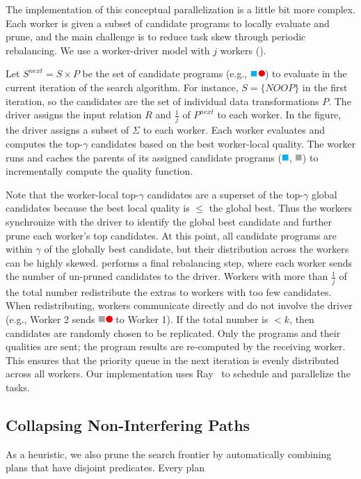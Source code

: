 The implementation of this conceptual parallelization is a little bit more complex. 
Each worker is given a subset of candidate programs to locally evaluate and prune, and the main challenge is to reduce task skew through periodic rebalancing.  We use a worker-driver model with $j$ workers ().

Let $S^{next} = S\times P$ be the set of candidate programs (e.g., \includegraphics[height=8pt]{figures/program.pdf}) to evaluate in the current iteration of the search algorithm. For instance, $S=\{NOOP\}$ in the first iteration, so the candidates are the set of individual data transformations $P$.   The driver assigns the input relation $R$ and $\frac{1}{j}$ of $P^{next}$ to each worker.  In the figure, the driver assigns a subset of $\Sigma$ to each worker.  Each worker evaluates and computes the top-$\gamma$ candidates based on the best worker-local quality.   The worker runs and caches the parents of its assigned candidate programs (\includegraphics[height=8pt]{figures/sq-blue.pdf}, \includegraphics[height=8pt]{figures/sq-grey.pdf}) to incrementally compute the quality function.
  
Note that the worker-local top-$\gamma$ candidates are a superset of the top-$\gamma$ global candidates because the best local quality is $\le$ the global best.   Thus the workers synchronize with the driver to identify the global best candidate and further prune each worker's top candidates.  At this point, all candidate programs are within $\gamma$ of the globally best candidate, but their distribution across the workers can be highly skewed.  \sys performs a final rebalancing step, where each worker sends the number of un-pruned candidates to the driver.  Workers with more than $\frac{1}{j}$ of the total number redistribute the extras to workers with too few candidates.  When redistributing, workers communicate directly and do not involve the driver (e.g., Worker 2 sends \includegraphics[height=8pt]{figures/program-greyred.pdf} to Worker 1).   If the total number is $<k$, then candidates are randomly chosen to be replicated.  Only the programs and their qualities are sent; the program results are re-computed by the receiving worker.  This ensures that the priority queue in the next iteration is evenly distributed across all workers.
Our implementation uses Ray~\cite{ray} to schedule and parallelize the tasks.


\subsection{Collapsing Non-Interfering Paths}
As a heuristic, we also prune the search frontier by automatically combining plans that have disjoint predicates.
Every plan
